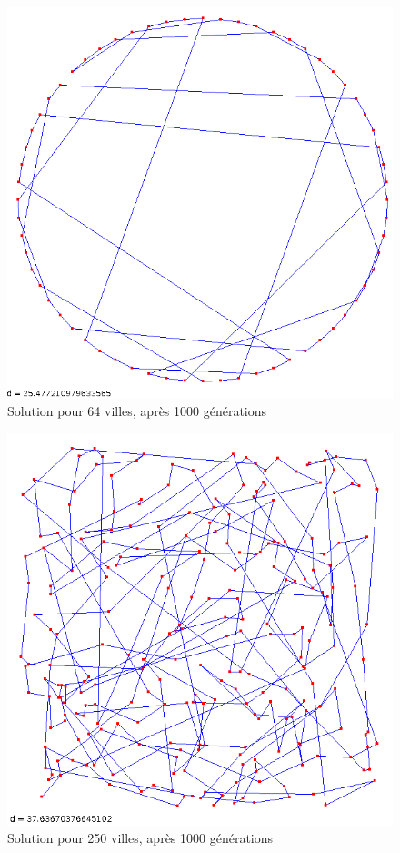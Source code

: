 \documentclass{article}
\begin{document}
\begin{figure}
	\begin{center}
		\includegraphics[scale=0.7]{images/64-1000gen}\\
		Solution pour 64 villes, après 1000 générations
	\end{center}
\end{figure}
\begin{figure}
	\begin{center}
		\includegraphics[scale=0.7]{images/250-1000gen}\\
		Solution pour 250 villes, après 1000 générations
	\end{center}
\end{figure}
\end{document}
